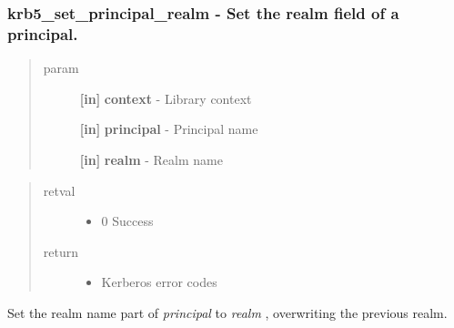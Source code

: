 \documentclass[letterpaper,10pt,english]{sphinxmanual}
\begin{document}
\subsubsection{krb5\_set\_principal\_realm -  Set the realm field of a principal.}
\label{appdev/refs/api/krb5_set_principal_realm::doc}\label{appdev/refs/api/krb5_set_principal_realm:krb5-set-principal-realm-set-the-realm-field-of-a-principal}

\begin{fulllineitems}
\label{appdev/refs/api/krb5_set_principal_realm:c.krb5_set_principal_realm}
\end{fulllineitems}

\begin{quote}\begin{description}
\item[{param}] \leavevmode
\textbf{{[}in{]}} \textbf{context} - Library context

\textbf{{[}in{]}} \textbf{principal} - Principal name

\textbf{{[}in{]}} \textbf{realm} - Realm name

\end{description}\end{quote}
\begin{quote}\begin{description}
\item[{retval}] \leavevmode\begin{itemize}
\item {} 
0   Success

\end{itemize}

\item[{return}] \leavevmode\begin{itemize}
\item {} 
Kerberos error codes

\end{itemize}

\end{description}\end{quote}

Set the realm name part of \emph{principal} to \emph{realm} , overwriting the previous realm.
\end{document}
